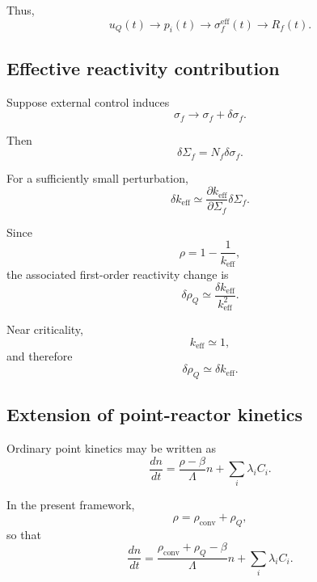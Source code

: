 Thus,
\begin{equation}
u_Q(t)
\rightarrow
p_i(t)
\rightarrow
\sigma_f^{\mathrm{eff}}(t)
\rightarrow
R_f(t).
\end{equation}

\subsection{Effective reactivity contribution}

Suppose external control induces
\begin{equation}
\sigma_f
\rightarrow
\sigma_f+\delta\sigma_f.
\end{equation}

Then
\begin{equation}
\delta\Sigma_f
=
N_f\delta\sigma_f.
\end{equation}

For a sufficiently small perturbation,
\begin{equation}
\delta k_{\mathrm{eff}}
\simeq
\frac{\partial k_{\mathrm{eff}}}{\partial\Sigma_f}
\delta\Sigma_f.
\end{equation}

Since
\begin{equation}
\rho
=
1-\frac{1}{k_{\mathrm{eff}}},
\end{equation}
the associated first-order reactivity change is
\begin{equation}
\delta\rho_Q
\simeq
\frac{\delta k_{\mathrm{eff}}}{k_{\mathrm{eff}}^2}.
\end{equation}

Near criticality,
\begin{equation}
k_{\mathrm{eff}}\simeq1,
\end{equation}
and therefore
\begin{equation}
\delta\rho_Q\simeq\delta k_{\mathrm{eff}}.
\end{equation}

\subsection{Extension of point-reactor kinetics}

Ordinary point kinetics may be written as
\begin{equation}
\frac{dn}{dt}
=
\frac{\rho-\beta}{\Lambda}n
+
\sum_i\lambda_i C_i.
\end{equation}

In the present framework,
\begin{equation}
\rho
=
\rho_{\mathrm{conv}}
+
\rho_Q,
\end{equation}
so that
\begin{equation}
\frac{dn}{dt}
=
\frac{
\rho_{\mathrm{conv}}
+
\rho_Q
-
\beta
}{
\Lambda
}n
+
\sum_i\lambda_iC_i.
\label{eq:extended_point_kinetics}
\end{equation}

